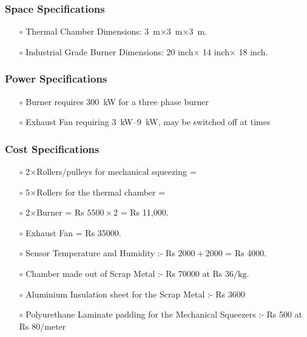\subsubsection{Space Specifications}
\begin{itemize}
    \item[$\scriptstyle\circ$]Thermal Chamber Dimensions: \SI{3}{\meter}$\times$\SI{3}{\meter}$\times$\SI{3}{\meter}.
    \item[$\scriptstyle\circ$]Industrial Grade Burner Dimensions: 20 inch$\times$ 14 inch$\times$ 18 inch.
\end{itemize}

\subsubsection{Power Specifications}
\begin{itemize}
    \item[$\scriptstyle\circ$]Burner requires \SI{300}{\kilo\watt} for a three phase burner
    \item[$\scriptstyle\circ$]Exhaust Fan requiring \SIrange{3}{9}{\kilo\watt}, may be switched off at times
\end{itemize}

\subsubsection{Cost Specifications}
\begin{itemize}
    \item[$\scriptstyle\circ$]2$\times$Rollers/pulleys for mechanical squeezing =
    \item[$\scriptstyle\circ$]5$\times$Rollers for the thermal chamber =
    \item[$\scriptstyle\circ$]2$\times$Burner = Rs $5500\times2$ = Rs 11,000. 
    \item[$\scriptstyle\circ$]Exhaust Fan = Rs 35000.
    \item[$\scriptstyle\circ$]Sensor Temperature and Humidity :- Rs $2000 + 2000$ = Rs 4000.
    \item[$\scriptstyle\circ$]	Chamber made out of Scrap Metal :- Rs 70000 at Rs \(36/\text{kg}\).
    \item[$\scriptstyle\circ$] Aluminium Insulation sheet for the Scrap Metal :- Rs 3600
    \item[$\scriptstyle\circ$] \Gls{Polyurethane Laminate} padding for the Mechanical Squeezers :- Rs 500 at Rs \(80/\text{meter}\)
\end{itemize}


